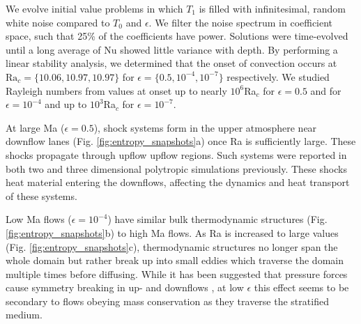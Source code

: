 \documentclass[aps, prl, twocolumn, nofootinbib, groupedaddress, amsfonts, amssymb, amsmath]{revtex4-1}
\begin{document}
We evolve initial value problems in which $T_1$ is
filled with infinitesimal, random white noise compared to $T_0$ and $\epsilon$.
We filter the noise spectrum in coefficient space, such that 25\% of the coefficients
have power.
Solutions were time-evolved until a long average of Nu showed little
variance with depth. By performing a linear stability analysis, 
we determined that the onset of convection
occurs at $\text{Ra}_c = \{10.06, 10.97, 10.97\}$ for $\epsilon = \{0.5, 10^{-4}, 10^{-7}\}$ respectively.  
We studied Rayleigh
numbers from values at onset up to nearly $10^6$Ra$_c$ for $\epsilon = 0.5$ and for $\epsilon = 10^{-4}$
and up to $10^3$Ra$_c$ for $\epsilon = 10^{-7}$.

At large Ma ($\epsilon = 0.5$), shock systems form in the upper atmosphere near downflow lanes 
(Fig. \ref{fig:entropy_snapshots}a) once Ra is sufficiently large.
These shocks propagate through upflow upflow regions.  
Such systems were reported in
both two \cite{cattaneo&all1990} and three \cite{malagoli&all1990} dimensional polytropic simulations previously.
These shocks heat material entering the downflows, affecting the dynamics and heat transport
of these systems.

Low Ma flows ($\epsilon = 10^{-4}$)
have similar bulk thermodynamic structures (Fig. \ref{fig:entropy_snapshots}b)
to high Ma flows.
As Ra is increased to large values 
(Fig. \ref{fig:entropy_snapshots}c), thermodynamic structures 
no longer span the whole domain but rather break up into 
small eddies which traverse the domain multiple
times before diffusing.  
While it has been suggested that pressure forces 
cause symmetry breaking in up- and downflows
\cite{hurlburt&all1984}, at low $\epsilon$ this 
effect seems to be secondary to flows obeying mass conservation as they traverse
the stratified medium.  
\end{document}
